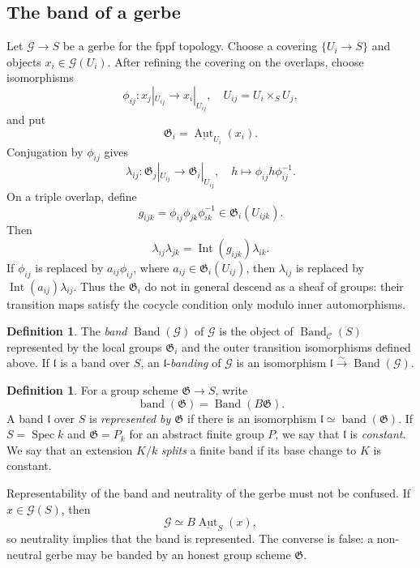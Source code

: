 \documentclass[11pt,reqno]{amsart}
\numberwithin{equation}{section}
\theoremstyle{plain}
\theoremstyle{definition}
\newtheorem{defi}[prop]{Definition}
\def\cG{{\mathcal G}}
\def\fG{{\mathfrak G}}
\def\Spec{{\operatorname{Spec}}}
\def\Aut{{\operatorname{Aut}}}
\def\ra{{\rightarrow}}
\begin{document}
\subsection{The band of a gerbe}

Let $\cG\to S$ be a gerbe for the fppf topology.  Choose a covering
$\{U_i\to S\}$ and objects $x_i\in\cG(U_i)$.  After refining the
covering on the overlaps, choose isomorphisms
\[
\phi_{ij}:x_j|_{U_{ij}}\ra x_i|_{U_{ij}},
\quad U_{ij}=U_i\times_S U_j,
\]
and put
\[
\fG_i=\underline{\Aut}_{U_i}(x_i).
\]
Conjugation by $\phi_{ij}$ gives
\[
\lambda_{ij}:\fG_j|_{U_{ij}}\ra \fG_i|_{U_{ij}},
\quad
h\longmapsto\phi_{ij}h\phi_{ij}^{-1}.
\]
On a triple overlap, define
\[
g_{ijk}=\phi_{ij}\phi_{jk}\phi_{ik}^{-1}\in\fG_i(U_{ijk}).
\]
Then
\begin{equation}\label{eq:band-outer-cocycle}
\lambda_{ij}\lambda_{jk}
=\operatorname{Int}(g_{ijk})\lambda_{ik}.
\end{equation}
If $\phi_{ij}$ is replaced by $a_{ij}\phi_{ij}$, where $a_{ij}\in \fG_i(U_{ij})$, then
$\lambda_{ij}$ is replaced by
$\operatorname{Int}(a_{ij})\lambda_{ij}$.  Thus the $\fG_i$ do not in
general descend as a sheaf of groups: their transition maps satisfy the
cocycle condition only modulo inner automorphisms.

\begin{defi}\label{def:band}
The \emph{band} $\operatorname{Band}(\cG)$ of $\cG$ is the object of
$\operatorname{Band}_{\mathcal C}(S)$ represented by the local groups
$\fG_i$ and the outer transition isomorphisms defined above. If $\mathfrak l$ is a band over $S$, an
$\mathfrak l$-\emph{banding} of $\cG$ is an isomorphism
$\mathfrak l\xrightarrow{\sim}\operatorname{Band}(\cG)$.
\end{defi}

\begin{defi}\label{def:represented-band}
For a group scheme $\fG\to S$, write
\[
\operatorname{band}(\fG)=\operatorname{Band}(B\fG).
\]
A band $\mathfrak l$ over $S$ is \emph{represented by $\fG$} if there
is an isomorphism
$\mathfrak l\simeq\operatorname{band}(\fG)$.  If $S=\Spec k$ and
$\fG=P_k$ for an abstract finite group $P$, we say that
$\mathfrak l$ is \emph{constant}.  We say that an extension $K/k$
\emph{splits} a finite band if its base change to $K$ is constant.
\end{defi}

Representability of the band and neutrality of the gerbe must not be
confused.  If $x\in\cG(S)$, then
\[
\cG\simeq B\underline{\Aut}_S(x),
\]
so neutrality implies that the band is represented.  The converse is
false: a non-neutral gerbe may be banded by an honest group scheme $\fG$.
\end{document}
